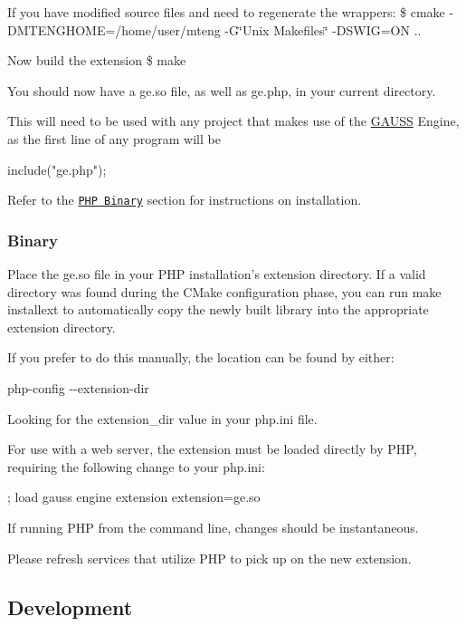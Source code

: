 If you have modified source files and need to regenerate the wrappers\-: \$ cmake -\/\-D\-M\-T\-E\-N\-G\-H\-O\-M\-E=/home/user/mteng -\/\-G\char`\"{}\-Unix Makefiles\char`\"{} -\/\-D\-S\-W\-I\-G=O\-N ..

Now build the extension \$ make

You should now have a {\ttfamily ge.\-so} file, as well as {\ttfamily ge.\-php}, in your current directory.

This will need to be used with any project that makes use of the \hyperlink{class_g_a_u_s_s}{G\-A\-U\-S\-S} Engine, as the first line of any program will be \begin{DoxyVerb}include("ge.php");
\end{DoxyVerb}


Refer to the \href{#php_install_binary}{\tt P\-H\-P Binary} section for instructions on installation.

\subsubsection*{Binary}

Place the {\ttfamily ge.\-so} file in your P\-H\-P installation's extension directory. If a valid directory was found during the C\-Make configuration phase, you can run {\ttfamily make installext} to automatically copy the newly built library into the appropriate extension directory.

If you prefer to do this manually, the location can be found by either\-:


\begin{DoxyEnumerate}
\item {\ttfamily php-\/config -\/-\/extension-\/dir}
\item Looking for the {\ttfamily extension\-\_\-dir} value in your {\ttfamily php.\-ini} file.
\end{DoxyEnumerate}

For use with a web server, the extension must be loaded directly by P\-H\-P, requiring the following change to your {\ttfamily php.\-ini}\-: \begin{DoxyVerb}; load gauss engine extension
extension=ge.so
\end{DoxyVerb}


If running P\-H\-P from the command line, changes should be instantaneous.

Please refresh services that utilize P\-H\-P to pick up on the new extension.

\subsection*{Development}

